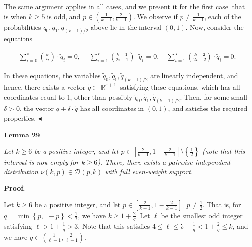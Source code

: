 The same argument applies in all cases, and we present it for the first case: that is when $k\geqslant 5$ is odd, and $p\in\left(\frac{1}{k-1},\frac{2}{k-1}\right)$.
We observe if $p\not=\frac{1}{k-1}$, each of the probabilities $q_{0},q_{1},q_{(k-1)/2}$ above lie in the interval $(0,1)$.
Now, consider the equations\par


\[\begin{gathered}
\sum_{i=0}^{s}\binom{k}{2i}\cdot\tilde{q}_{i}=0,\ \quad\sum_{i=1}^{s}\binom{k-1}{2i-1}\cdot\tilde{q}_{i}=0,\quad\sum_{i=1}^{s}\binom{k-2}{2i-2}\cdot\tilde{q}_{i}=0.
\end{gathered}\]


In these equations, the variables $\tilde{q}_{0},\tilde{q}_{1},\tilde{q}_{(k-1)/2}$ are linearly independent, and hence, there exists a vector $\tilde{q}\in\mathop{\mathbb{R}}^{s+1}$ satisfying these equations, which has all coordinates equal to 1, other than possibly $\tilde{q}_{0},\tilde{q}_{1},\tilde{q}_{(k-1)/2}$.
Then, for some small $\delta>0$, the vector $q+\delta\cdot\tilde{q}$ has all coordinates in $(0,1)$, and satisfies the required properties. $\blacktriangleleft$\par





\par\medskip\noindent\textbf{
\textbf{Lemma 29}\textbf{.}
}\par



\emph{Let $k\geqslant 6$ be a positive integer, and let $p\in\left[\frac{2}{k-1},1-\frac{2}{k-1}\right]\setminus\left\{\frac{1}{2}\right\}$ (note that this interval is non-empty for $k\geqslant 6$).
There, there exists a pairwise independent distribution $\nu(k,p)\in\mathcal{D}(p,k)$ with full even-weight support.}\par







\par\medskip\noindent\textbf{Proof.}\par




Let $k\geqslant 6$ be a positive integer, and let $p\in\left[\frac{2}{k-1},1-\frac{2}{k-1}\right],\ p\not=\frac{1}{2}$.
That is, for $q=\min\left\{p,1-p\right\}<\frac{1}{2}$, we have $k\geqslant 1+\frac{2}{q}$.
Let $\ell$ be the smallest odd integer satisfying $\ell>1+\frac{1}{q}>3$.
Note that this satisfies $4\leqslant\ell\leqslant 3+\frac{1}{q}<1+\frac{2}{q}\leqslant k$, and we have $q\in\left(\frac{1}{\ell-1},\frac{2}{\ell-1}\right)$.\par




